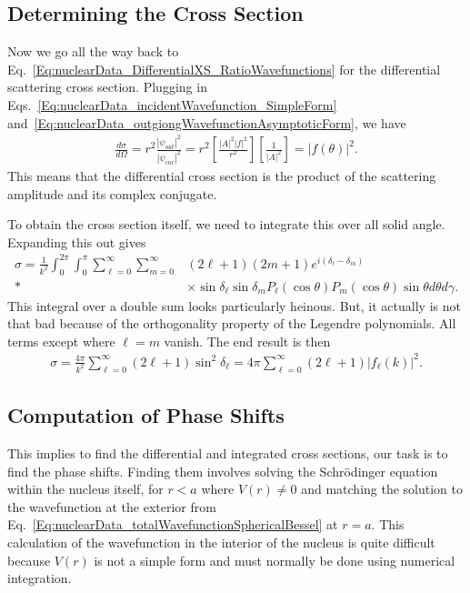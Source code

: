 \subsection{Determining the Cross Section}

Now we go all the way back to Eq.~\eqref{Eq:nuclearData_DifferentialXS_RatioWavefunctions} for the differential scattering cross section. Plugging in Eqs.~\eqref{Eq:nuclearData_incidentWavefunction_SimpleForm} and~\eqref{Eq:nuclearData_outgiongWavefunctionAsymptoticForm}, we have
\begin{align} 
  \frac{d\sigma}{d\Omega} = r^2 \frac{ | \psi_{out} |^2 }{ | \psi_{inc} |^2 } = r^2 \left[ \frac{ |A|^2 |f|^2 }{ r^2 } \right] \left[ \frac{1}{|A|^2} \right] = | f(\theta) |^2 .
\end{align}
This means that the differential cross section is the product of the scattering amplitude and its complex conjugate.

To obtain the cross section itself, we need to integrate this over all solid angle. Expanding this out gives
\begin{align}
  \sigma = \frac{1}{k^2} \int_0^{2\pi} \int_0^\pi \sum_{\ell = 0}^\infty \sum_{m = 0}^\infty &( 2 \ell + 1 ) ( 2 m + 1 ) e^{i(\delta_\ell - \delta_m)} \nonumber \\* &\times \sin\delta_\ell \sin\delta_m P_\ell(\cos\theta) P_m(\cos\theta) \sin\theta d\theta d\gamma .
\end{align}
This integral over a double sum looks particularly heinous. But, it actually is not that bad because of the orthogonality property of the Legendre polynomials. All terms except where $\ell = m$ vanish. The end result is then
\begin{align} \label{Eq:nuclearData_crossSection_PhaseShift}
  \sigma = \frac{4\pi}{k^2} \sum_{\ell=0}^\infty ( 2 \ell + 1 ) \sin^2 \delta_\ell = 4\pi \sum_{\ell=0}^\infty ( 2 \ell + 1 ) | f_\ell(k) |^2  .
\end{align}

\subsection{Computation of Phase Shifts}

This implies to find the differential and integrated cross sections, our task is to find the phase shifts. Finding them involves solving the Schr\"{o}dinger equation within the nucleus itself, for $r < a$ where $V(r) \ne 0$ and matching the solution to the wavefunction at the exterior from Eq.~\eqref{Eq:nuclearData_totalWavefunctionSphericalBessel} at $r = a$. This calculation of the wavefunction in the interior of the nucleus is quite difficult because $V(r)$ is not a simple form and must normally be done using numerical integration. 

